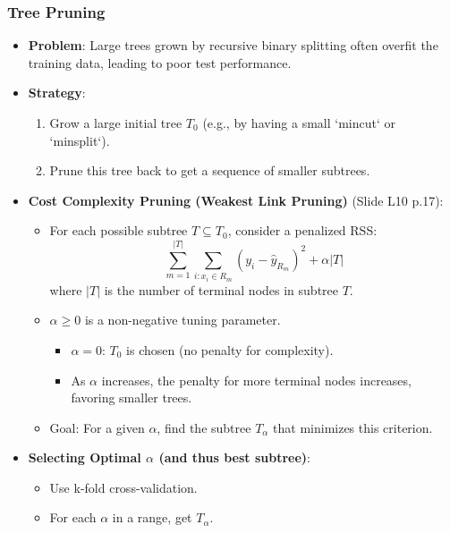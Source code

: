 \documentclass[12pt,a4paper]{article}
\begin{document}
\begin{itemize}
    \subsubsection{Tree Pruning }
        \begin{itemize}
            \item \textbf{Problem}: Large trees grown by recursive binary splitting often overfit the training data, leading to poor test performance.
            \item \textbf{Strategy}:
                \begin{enumerate}
                    \item Grow a large initial tree $T_0$ (e.g., by having a small `mincut` or `minsplit`).
                    \item Prune this tree back to get a sequence of smaller subtrees.
                \end{enumerate}
            \item \textbf{Cost Complexity Pruning (Weakest Link Pruning)} (Slide L10 p.17):
                \begin{itemize}
                    \item For each possible subtree $T \subseteq T_0$, consider a penalized RSS:
                        $$ \sum_{m=1}^{|T|} \sum_{i: x_i \in R_m} (y_i - \hat{y}_{R_m})^2 + \alpha |T| $$
                        where $|T|$ is the number of terminal nodes in subtree $T$.
                    \item $\alpha \ge 0$ is a non-negative tuning parameter.
                        \begin{itemize}
                            \item $\alpha=0$: $T_0$ is chosen (no penalty for complexity).
                            \item As $\alpha$ increases, the penalty for more terminal nodes increases, favoring smaller trees.
                        \end{itemize}
                    \item Goal: For a given $\alpha$, find the subtree $T_\alpha$ that minimizes this criterion.
                \end{itemize}
            \item \textbf{Selecting Optimal $\alpha$ (and thus best subtree)}:
                \begin{itemize}
                    \item Use k-fold cross-validation.
                    \item For each $\alpha$ in a range, get $T_\alpha$.

\end{itemize}
\end{itemize}
\end{itemize}
\end{document}

